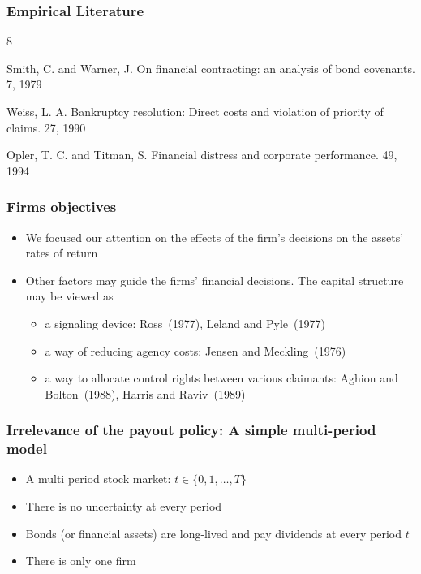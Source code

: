 \documentclass[blue]{beamer}
\theoremstyle{definition}
\theoremstyle{example}
\begin{document}
\begin{frame}\frametitle{Empirical Literature}


\begin{thebibliography}{8}

    \beamertemplatearticlebibitems

    Smith, C. and Warner, J.
    \newblock On financial contracting: an analysis of bond covenants.
     7, 1979

    Weiss, L. A.
    \newblock Bankruptcy resolution: Direct costs and violation of priority of claims.
     27, 1990


    Opler, T. C. and Titman, S.
    \newblock Financial distress and corporate performance.
     49, 1994



    \end{thebibliography}


\end{frame}


\begin{frame}\frametitle{Firms objectives}

\begin{itemize}
\item We focused our attention on the effects of the firm's decisions on the assets' rates of return
\item Other factors may guide the firms' financial decisions. The capital structure may be viewed as
    \begin{itemize}
    \item a signaling device: Ross~(1977), Leland and Pyle~(1977)
    \item a way of reducing agency costs: Jensen and Meckling~(1976)
    \item a way to allocate control rights between various claimants: Aghion and Bolton~(1988), Harris and Raviv~(1989)
    \end{itemize}
\end{itemize}

\end{frame}



\begin{frame}\frametitle{Irrelevance of the payout policy: A simple multi-period model}

\begin{itemize}
\item A multi period stock market: $t \in \{0,1,\ldots,T\}$
\item There is no uncertainty at every period
\item Bonds (or financial assets) are \alert{long-lived} and pay dividends at every period $t$
\item There is only one firm
\end{itemize}

\end{frame}
\end{document}
